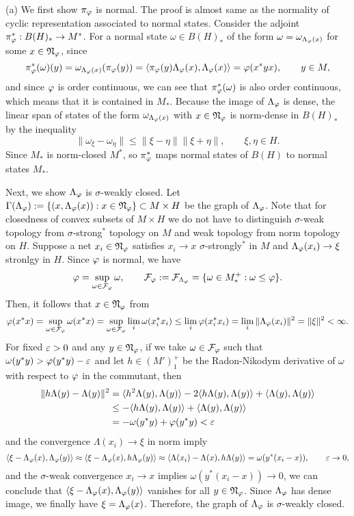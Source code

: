 \documentclass{../../large}
\begin{document}
\begin{pf}
(a)
We first show $\pi_\varphi$ is normal.
The proof is almost same as the normality of cyclic representation associated to normal states.
Consider the adjoint $\pi_\varphi^*:B(H)_*\to M^*$.
For a normal state $\omega\in B(H)_*$ of the form $\omega=\omega_{\Lambda_\varphi(x)}$ for some $x\in\mathfrak{N}_\varphi$, since
\[\pi_\varphi^*(\omega)(y)=\omega_{\Lambda_\varphi(x)}(\pi_\varphi(y))=\langle\pi_\varphi(y)\Lambda_\varphi(x),\Lambda_\varphi(x)\rangle=\varphi(x^*yx),\qquad y\in M,\]
and since $\varphi$ is order continuous, we can see that $\pi_\varphi^*(\omega)$ is also order continuous, which means that it is contained in $M_*$.
Because the image of $\Lambda_\varphi$ is dense, the linear span of states of the form $\omega_{\Lambda_\varphi(x)}$ with $x\in\mathfrak{N}_\varphi$ is norm-dense in $B(H)_*$ by the inequality
\[\|\omega_\xi-\omega_\eta\|\le\|\xi-\eta\|\|\xi+\eta\|,\qquad\xi,\eta\in H.\]
Since $M_*$ is norm-closed $M^*$, so $\pi_\varphi^*$ maps normal states of $B(H)$ to normal states $M_*$.

Next, we show $\Lambda_\varphi$ is $\sigma$-weakly closed.
Let $\Gamma(\Lambda_\varphi):=\{(x,\Lambda_\varphi(x)):x\in\mathfrak{N}_\varphi\}\subset M\times H$ be the graph of $\Lambda_\varphi$.
Note that for closedness of convex subsets of $M\times H$ we do not have to distinguish $\sigma$-weak topology from $\sigma$-strong$^*$ topology on $M$ and weak topology from norm topology on $H$.
Suppose a net $x_i\in\mathfrak{N}_\varphi$ satisfies $x_i\to x$ $\sigma$-strongly$^*$ in $M$ and $\Lambda_\varphi(x_i)\to\xi$ stronlgy in $H$.
Since $\varphi$ is normal, we have
\[\varphi=\sup_{\omega\in\mathcal{F}_\varphi}\omega,\qquad\mathcal{F}_\varphi:=\mathcal{F}_{\Lambda_\varphi}=\{\omega\in M_*^+:\omega\le\varphi\}.\]
Then, it follows that $x\in\mathfrak{N}_\varphi$ from
\[\varphi(x^*x)=\sup_{\omega\in\mathcal{F}_\varphi}\omega(x^*x)=\sup_{\omega\in\mathcal{F}_\varphi}\lim_i\omega(x_i^*x_i)\le\lim_i\varphi(x_i^*x_i)=\lim_i\|\Lambda_\varphi(x_i)\|^2=\|\xi\|^2<\infty.\]
For fixed $\varepsilon>0$ and any $y\in\mathfrak{N}_\varphi$, if we take $\omega\in\mathcal{F}_\varphi$ such that $\omega(y^*y)>\varphi(y^*y)-\varepsilon$ and let $h\in(M')_1^+$ be the Radon-Nikodym derivative of $\omega$ with respect to $\varphi$ in the commutant, then
\begin{align*}
\|h\Lambda(y)-\Lambda(y)\|^2
&=\langle h^2\Lambda(y),\Lambda(y)\rangle-2\langle h\Lambda(y),\Lambda(y)\rangle+\langle\Lambda(y),\Lambda(y)\rangle\\
&\le-\langle h\Lambda(y),\Lambda(y)\rangle+\langle\Lambda(y),\Lambda(y)\rangle\\
&=-\omega(y^*y)+\varphi(y^*y)<\varepsilon
\end{align*}
and the convergence $\Lambda(x_i)\to\xi$ in norm imply
\[\langle\xi-\Lambda_\varphi(x),\Lambda_\varphi(y)\rangle\approx\langle\xi-\Lambda_\varphi(x),h\Lambda_\varphi(y)\rangle\approx\langle\Lambda(x_i)-\Lambda(x),h\Lambda(y)\rangle=\omega(y^*(x_i-x)),\qquad\varepsilon\to0,\]
and the $\sigma$-weak convergence $x_i\to x$ implies $\omega(y^*(x_i-x))\to0$, we can conclude that $\langle\xi-\Lambda_\varphi(x),\Lambda_\varphi(y)\rangle$ vanishes for all $y\in\mathfrak{N}_\varphi$.
Since $\Lambda_\varphi$ has dense image, we finally have $\xi=\Lambda_\varphi(x)$.
Therefore, the graph of $\Lambda_\varphi$ is $\sigma$-weakly closed.


\end{pf}
\end{document}
